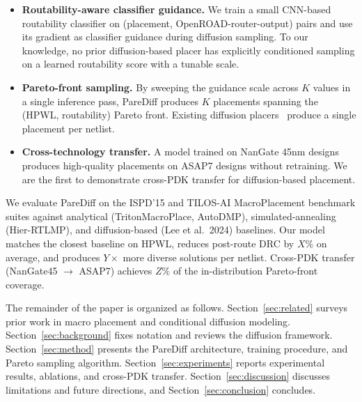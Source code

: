\begin{itemize}
\item \textbf{Routability-aware classifier guidance.} We train a small CNN-based routability classifier on (placement, OpenROAD-router-output) pairs and use its gradient as classifier guidance during diffusion sampling. To our knowledge, no prior diffusion-based placer has explicitly conditioned sampling on a learned routability score with a tunable scale.

\item \textbf{Pareto-front sampling.} By sweeping the guidance scale across $K$ values in a single inference pass, PareDiff produces $K$ placements spanning the (HPWL, routability) Pareto front. Existing diffusion placers~\cite{lee2024chipdiffusion, trung2025diffplace, fang2025graphdiffusion} produce a single placement per netlist.

\item \textbf{Cross-technology transfer.} A model trained on NanGate 45nm designs produces high-quality placements on ASAP7 designs without retraining. We are the first to demonstrate cross-PDK transfer for diffusion-based placement.
\end{itemize}

We evaluate PareDiff on the ISPD'15 and TILOS-AI MacroPlacement benchmark suites against analytical (TritonMacroPlace, AutoDMP), simulated-annealing (Hier-RTLMP), and diffusion-based (Lee et al.\ 2024) baselines. Our model matches the closest baseline on HPWL, reduces post-route DRC by $X\%$ on average, and produces $Y\times$ more diverse solutions per netlist. Cross-PDK transfer (NanGate45 $\to$ ASAP7) achieves $Z\%$ of the in-distribution Pareto-front coverage.

The remainder of the paper is organized as follows. Section~\ref{sec:related} surveys prior work in macro placement and conditional diffusion modeling. Section~\ref{sec:background} fixes notation and reviews the diffusion framework. Section~\ref{sec:method} presents the PareDiff architecture, training procedure, and Pareto sampling algorithm. Section~\ref{sec:experiments} reports experimental results, ablations, and cross-PDK transfer. Section~\ref{sec:discussion} discusses limitations and future directions, and Section~\ref{sec:conclusion} concludes.
